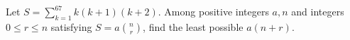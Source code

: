 Let $S=\sum_{k=1}^{67}k(k+1)(k+2)$. Among positive integers $a,n$ and integers $0\le r\le n$ satisfying $S=a\binom nr$, find the least possible $a(n+r)$.
